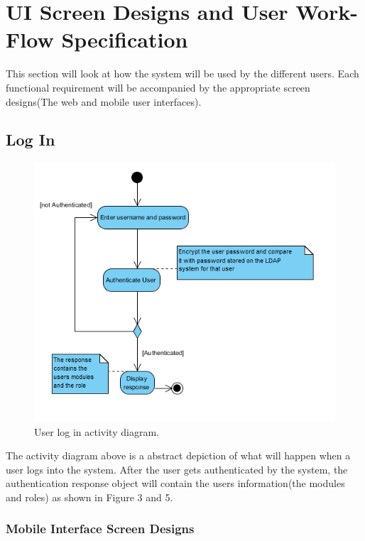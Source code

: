 \documentclass[12pt]{article}
\begin{document}
	\newpage
	\section{UI Screen Designs and User Work-Flow Specification}
	
		This section will look at how the system will be used by the different users. Each functional requirement will be accompanied by the appropriate screen designs(The web and mobile user interfaces). 

	\subsection{Log In}
		\begin{figure}[htbp]
		\centering
		\includegraphics[width=0.7\linewidth]{./Diagrams/uml_login}
		\caption{User log in activity diagram.}
		\label{fig:uml_login}
		\end{figure}
	
	The activity diagram above is a abstract depiction of what will happen when a user logs into the system. After the user gets authenticated by the system, the authentication response object will contain the users information(the modules and roles) as shown in Figure 3 and 5.
	
	\pagebreak
	
	\subsubsection{Mobile Interface Screen Designs}
	
\end{document}
